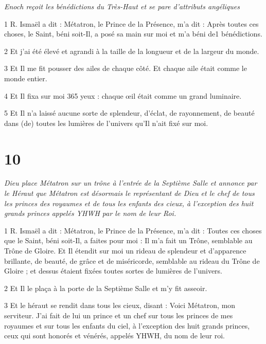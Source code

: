 \par \textit{Enoch reçoit les bénédictions du Très-Haut et se pare d'attributs angéliques}

\par 1 R. Ismaël a dit : Métatron, le Prince de la Présence, m'a dit : Après toutes ces choses, le Saint, béni soit-Il, a posé sa main sur moi et m'a béni de1 bénédictions.

\par 2 Et j'ai été élevé et agrandi à la taille de la longueur et de la largeur du monde.

\par 3 Et Il me fit pousser des ailes de chaque côté. Et chaque aile était comme le monde entier.

\par 4 Et Il fixa sur moi 365 yeux : chaque œil était comme un grand luminaire.

\par 5 Et Il n'a laissé aucune sorte de splendeur, d'éclat, de rayonnement, de beauté dans (de) toutes les lumières de l'univers qu'Il n'ait fixé sur moi.

\chapter{10}

\par \textit{Dieu place Métatron sur un trône à l'entrée de la Septième Salle et annonce par le Héraut que Métatron est désormais le représentant de Dieu et le chef de tous les princes des royaumes et de tous les enfants des cieux, à l'exception des huit grands princes appelés YHWH par le nom de leur Roi.}

\par 1 R. Ismaël a dit : Métatron, le Prince de la Présence, m'a dit : Toutes ces choses que le Saint, béni soit-Il, a faites pour moi : Il m'a fait un Trône, semblable au Trône de Gloire. Et Il étendit sur moi un rideau de splendeur et d'apparence brillante, de beauté, de grâce et de miséricorde, semblable au rideau du Trône de Gloire ; et dessus étaient fixées toutes sortes de lumières de l’univers.

\par 2 Et Il le plaça à la porte de la Septième Salle et m'y fit asseoir.

\par 3 Et le héraut se rendit dans tous les cieux, disant : Voici Métatron, mon serviteur. J'ai fait de lui un prince et un chef sur tous les princes de mes royaumes et sur tous les enfants du ciel, à l'exception des huit grands princes, ceux qui sont honorés et vénérés, appelés YHWH, du nom de leur roi.

